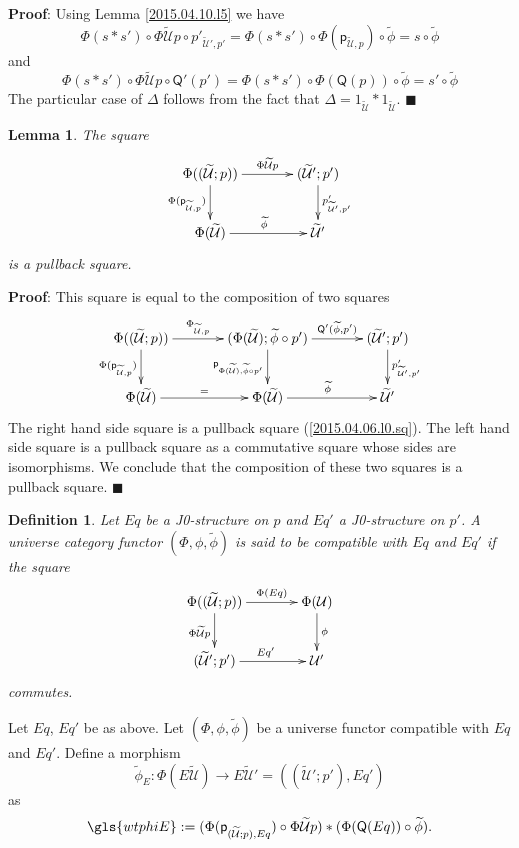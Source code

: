 \documentclass[12pt]{article}
\numberwithin{equation}{section}
\newenvironment{eq}{\begin{equation}}{\end{equation}}
\newenvironment{myproof}{{\bf Proof}:}{$\blacksquare$ \vskip 5mm }
\newtheorem{lemma}[proposition]{Lemma}
\newtheorem{definition}[proposition]{Definition}
\newcommand{\sr}{\rightarrow}
\newcommand{\wt}{\widetilde}
\newcommand{\id}{1}            %
\newcommand{\p}{\mathsf{p}}
\newcommand{\U}{\mathcal{U}}
\newcommand{\Q}{\mathsf{Q}}
\begin{document}
%
\begin{myproof}
Using Lemma \ref{2015.04.10.l5} we have
%
$$\Phi(s*s')\circ \Phi\wt{\U}p\circ
p'_{\wt{\U}',p'}=\Phi(s*s')\circ\Phi(\p_{\wt{\U},p})\circ\wt{\phi}=s\circ
\wt{\phi}$$
%
and
%
$$\Phi(s*s')\circ \Phi\wt{\U}p\circ \Q'(p')=\Phi(s*s')\circ \Phi(\Q(p))\circ
\wt{\phi}=s'\circ\wt{\phi}$$
%
The particular case of $\Delta$ follows from the fact that
$\Delta=\id_{\wt{\U}}*\id_{\wt{\U}}$.
\end{myproof}
%
\begin{lemma}
\label{2015.04.06.l5} The square
%
\begin{eq}\label{2015.04.06.eq10-bis}
\begin{xy}
          \xymatrix@C=3pc{ \Phi((\wt{\U};p)) \ar[r]^-{\Phi\wt{\U}p} \ar[d]_{
              \Phi(\p_{\wt{\U},p})} & (\wt{\U}';p')
            \ar[d]^{p'_{\wt{\U}',p'}}\\ \Phi(\wt{\U}) \ar[r]^{\wt{\phi}} &
            \wt{\U}' }
\end{xy}
\end{eq}%
%
is a pullback square.
\end{lemma}
%
\begin{myproof}
This square is equal to the composition of two squares
%
$$
\begin{xy}
          \xymatrix@C=3pc{ \Phi((\wt{\U};p)) \ar[r]^-{\Phi_{\wt{\U},p}}\ar[d]_{
              \Phi(\p_{\wt{\U},p})} & (\Phi(\wt{\U});\wt{\phi}\circ p')
            \ar[r]^-{\Q'(\wt{\phi},p')}\ar[d]_{\p_{\Phi(\wt{\U}),\wt{\phi}\circ
                p'}} & (\wt{\U}';p') \ar[d]^{p'_{\wt{\U}',p'}}\\ \Phi(\wt{\U})
            \ar[r]^{=} & \Phi(\wt{\U}) \ar[r]^{\wt{\phi}} & \wt{\U}' }
\end{xy}
$$
%
The right hand side square is a pullback square (\ref{2015.04.06.l0.sq}). The
left hand side square is a pullback square as a commutative square whose sides
are isomorphisms. We conclude that the composition of these two squares is a
pullback square.
\end{myproof}
%
\begin{definition}
\label{2015.04.06.def4} Let $Eq$ be a J0-structure on $p$ and $Eq'$ a
J0-structure on $p'$. A universe category functor $(\Phi,\phi,\wt{\phi})$ is
said to be compatible with $Eq$ and $Eq'$ if the square
%
\begin{eq}\label{2015.04.06.eq6}
\begin{xy}
          \xymatrix@C=3pc{ \Phi((\wt{\U};p)) \ar[r]^-{\Phi(Eq)}
            \ar[d]_{\Phi\wt{\U}p} & \Phi(\U) \ar[d]^{\phi}\\ (\wt{\U}';p')
            \ar[r]^{Eq'} & \U' }
\end{xy}
\end{eq}%
%
commutes.
\end{definition}
%
Let $Eq$, $Eq'$ be as above. Let $(\Phi,\phi,\wt{\phi})$ be a universe functor
compatible with $Eq$ and $Eq'$. Define a morphism
%
$$\wt{\phi}_{E}:\Phi(E\wt{\U})\sr E\wt{\U}'=((\wt{\U}';p'),Eq')$$
%
as
$$\gls{wtphiE} := (\Phi(\p_{(\wt{\U};p),Eq})\circ \Phi\wt{\U}p)*(\Phi(\Q(Eq))\circ \wt{\phi}).$$
\end{document}
